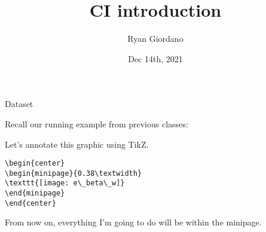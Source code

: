 \documentclass[8pt]{beamer}\usepackage[]{graphicx}\usepackage[]{color}
\title{CI introduction}
\author{Ryan Giordano}
\date{Dec 14th, 2021}
\institute{Massachusetts Institute of Technology}
\begin{document}

\begin{frame}[fragile]{Dataset}

Recall our running example from previous classes:\footnotemark[1]




\hrulefill

Let's annotate this graphic using TikZ.

\begin{lstlisting}
\begin{center}
\begin{minipage}{0.38\textwidth}
\texttt{[image: e\_beta\_w]}
\end{minipage}
\end{center}
\end{lstlisting}

From now on, everything I'm going to do will be within the minipage.

\vfill
{}

\end{frame}
\end{document}
